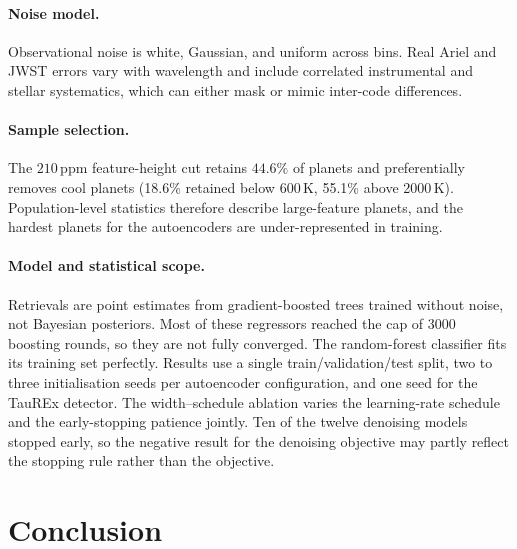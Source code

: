 \paragraph{Noise model.}
Observational noise is white, Gaussian, and uniform across bins.
Real Ariel and JWST errors vary with wavelength and include correlated instrumental and stellar systematics, which can either mask or mimic inter-code differences.

\paragraph{Sample selection.}
The $210\,\mathrm{ppm}$ feature-height cut retains $44.6\%$ of planets and preferentially removes cool planets (18.6\% retained below 600\,K, 55.1\% above 2000\,K).
Population-level statistics therefore describe large-feature planets, and the hardest planets for the autoencoders are under-represented in training.

\paragraph{Model and statistical scope.}
Retrievals are point estimates from gradient-boosted trees trained without noise, not Bayesian posteriors.
Most of these regressors reached the cap of 3000 boosting rounds, so they are not fully converged.
The random-forest classifier fits its training set perfectly.
Results use a single train/validation/test split, two to three initialisation seeds per autoencoder configuration, and one seed for the TauREx detector.
The width--schedule ablation varies the learning-rate schedule and the early-stopping patience jointly.
Ten of the twelve denoising models stopped early, so the negative result for the denoising objective may partly reflect the stopping rule rather than the objective.

\section{Conclusion}
\label{sec:conclusion}

